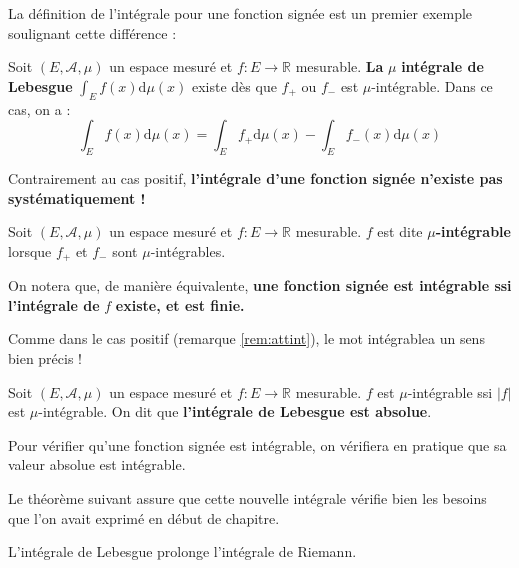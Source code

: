 \documentclass[../integ-proba.tex]{subfiles}
\begin{document}
La définition de l'intégrale pour une fonction signée est un premier exemple soulignant cette différence :

\begin{defi}
  Soit $\left(E,\mathcal{A},\mu\right)$ un espace mesuré et $f:E\rightarrow\mathbb{R}$ mesurable.
  \textbf{La} $\mu$ \textbf{intégrale de Lebesgue} $\displaystyle\int_E f(x) \text{d}\mu(x)$ existe dès que $f_+$ ou $f_-$ est $\mu$-intégrable.
  Dans ce cas, on a :
  $$
  \int_E f(x) \text{d}\mu(x)=\int_Ef_+\text{d}\mu(x) - \int_Ef_-(x)\text{d}\mu(x)
  $$
\end{defi}

\begin{rem}
  Contrairement au cas positif, \textbf{l'intégrale d'une fonction signée n'existe pas systématiquement !}
\end{rem}

\begin{defi}
  Soit $\left(E,\mathcal{A},\mu\right)$ un espace mesuré et $f:E\rightarrow\mathbb{R}$ mesurable.
  $f$ est dite $\mu$\textbf{-intégrable} lorsque $f_+$ et $f_-$ sont $\mu$-intégrables.
\end{defi}

\begin{rem}
  On notera que, de manière équivalente, \textbf{une fonction signée est intégrable ssi l'intégrale de} $f$ \textbf{existe, et est finie.}
\end{rem}

\begin{rem}
  Comme dans le cas positif (remarque \ref{rem:attint}), le mot \og intégrable\fg a un sens bien précis !
\end{rem}

\begin{thm}
  Soit $\left(E, \mathcal{A}, \mu\right)$ un espace mesuré et $f:E\longrightarrow\mathbb{R}$ mesurable. $f$ est $\mu$-intégrable ssi $\left|f\right|$ est $\mu$-intégrable.
  On dit que \textbf{l'intégrale de Lebesgue est absolue}.
\end{thm}

\begin{rem}
  Pour vérifier qu'une fonction signée est intégrable, on vérifiera en pratique que sa valeur absolue est intégrable.
\end{rem}

Le théorème suivant assure que cette nouvelle intégrale vérifie bien les besoins que l'on avait exprimé en début de chapitre.

\begin{thm}
  L'intégrale de Lebesgue prolonge l'intégrale de Riemann.
\end{thm}
\end{document}
